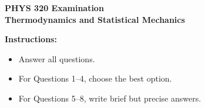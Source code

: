 \documentclass[11pt]{article}
\begin{document}
\begin{center}
  {\Large \textbf{PHYS 320 Examination}}\\[0.25em]
  {\large \textbf{Thermodynamics and Statistical Mechanics}}\\[0.5em]
\end{center}

\noindent\textbf{Instructions:}
\begin{itemize}
  \item Answer all questions.
  \item For Questions 1--4, choose the best option.
  \item For Questions 5--8, write brief but precise answers.
\end{itemize}

\vspace{0.5em}
\end{document}
